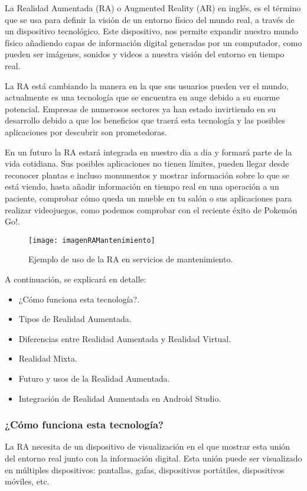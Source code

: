 La Realidad Aumentada (RA) o Augmented Reality (AR) en inglés, es el término que se usa para definir la visión de un entorno físico del mundo real, a través de un dispositivo tecnológico. Este dispositivo, nos permite expandir nuestro mundo físico añadiendo capas de información digital generadas por un computador, como pueden ser imágenes, sonidos y videos a nuestra visión del entorno en tiempo real. 

La RA está cambiando la manera en la que sus usuarios pueden ver el mundo, actualmente es una tecnología que se encuentra en auge debido a su enorme potencial. Empresas de numerosos sectores ya han estado invirtiendo en su desarrollo debido a que los beneficios que traerá esta tecnología y las posibles aplicaciones por descubrir son prometedoras.


En un futuro la RA estará integrada en nuestro dia a dia y formará parte de la vida cotidiana. Sus posibles aplicaciones no tienen límites, pueden llegar desde reconocer plantas e incluso monumentos y mostrar información sobre lo que se está viendo, hasta añadir información en tiempo real en una operación a un paciente, comprobar cómo queda un mueble en tu salón o sus aplicaciones para realizar videojuegos, como podemos comprobar con el reciente éxito de Pokemón Go!. 

\begin{figure}[h]
    \centering
    \texttt{[image: imagenRAMantenimiento]}
    \caption{Ejemplo de uso de la RA en servicios de mantenimiento.}
    \label{fig:googleglass}
\end{figure}

A continuación, se explicará en detalle:
\begin{itemize}
\item ¿Cómo funciona esta tecnología?.
\item Tipos de Realidad Aumentada.
\item Diferencias entre Realidad Aumentada y Realidad Virtual.
\item Realidad Mixta.
\item Futuro y usos de la Realidad Aumentada.
\item Integración de Realidad Aumentada en Android Studio.
\end{itemize}  

\subsubsection{¿Cómo funciona esta tecnología?}
La RA necesita de un dispositivo de visualización en el que mostrar esta unión del entorno real junto con la información digital. Esta unión puede ser visualizado en múltiples dispositivos: pantallas, gafas, dispositivos portátiles, dispositivos móviles, etc.
 
